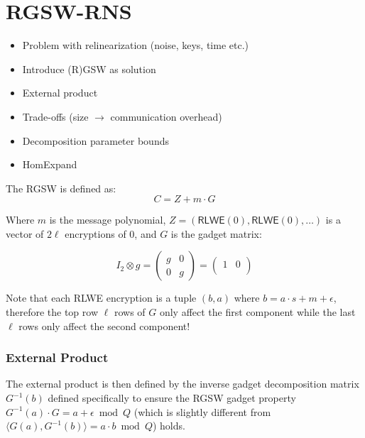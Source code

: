 \section{RGSW-RNS}
\label{sec:rgsw}
\ifnotes
\begin{itemize}
    \item Problem with relinearization (noise, keys, time etc.)
    \item Introduce (R)GSW as solution
    \item External product
    \item Trade-offs (size $\to$ communication overhead)
    \item Decomposition parameter \paramDecomp bounds
    \item HomExpand
\end{itemize}
\fi

The RGSW is defined as:
\begin{equation*}
    C = Z + m\cdot G
\end{equation*}

Where $m$ is the message polynomial, $Z = (\mathsf{RLWE}(0), \mathsf{RLWE}(0), \dots)$ is a vector of $2\ell$ encryptions of 0, and $G$ is the gadget matrix:

\begin{equation*}
    I_2\otimes g = \begin{pmatrix}
        g & 0 \\
        0 & g
    \end{pmatrix}
    = \begin{pmatrix}
        1 & 0 \\
        
    \end{pmatrix}
\end{equation*}

Note that each RLWE encryption is a tuple $(b, a)$ where $b = a\cdot s + m +\epsilon$, therefore the top row $\ell$ rows of $G$ only affect the first component while the last $\ell$ rows only affect the second component!

\subsubsection{External Product}
The external product is then defined by the inverse gadget decomposition matrix $G^{-1}(b)$ defined specifically to ensure the RGSW gadget property $G^{-1}(a)\cdot G = a + \epsilon \bmod{Q}$ (which is slightly different from $\langle G(a), G^{-1}(b) \rangle = a\cdot b \bmod{Q}$) holds.

